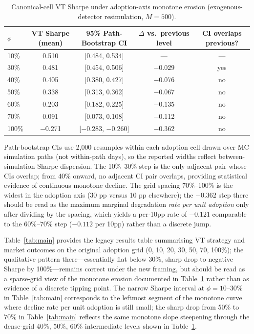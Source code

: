 \documentclass[12pt,a4paper]{article}
\begin{document}
\begin{table}[H]
\centering
\begin{threeparttable}
\caption{Canonical-cell VT Sharpe under adoption-axis monotone erosion (exogenous-detector resimulation, $M = 500$).}
\label{tab:vt_monotone_curve}
\footnotesize
\begin{tabular}{@{}lcccc@{}}
\toprule
$\phi$ & VT Sharpe (mean) & 95\% Path-Bootstrap CI & $\Delta$ vs.\ previous level & CI overlaps previous? \\
\midrule
10\%  & 0.510  & [0.484, 0.534]   & ---     & ---  \\
30\%  & 0.481  & [0.454, 0.506]   & $-$0.029 & yes  \\
40\%  & 0.405  & [0.380, 0.427]   & $-$0.076 & no   \\
50\%  & 0.338  & [0.313, 0.362]   & $-$0.067 & no   \\
60\%  & 0.203  & [0.182, 0.225]   & $-$0.135 & no   \\
70\%  & 0.091  & [0.073, 0.108]   & $-$0.112 & no   \\
100\% & $-$0.271 & [$-$0.283, $-$0.260] & $-$0.362 & no   \\
\bottomrule
\end{tabular}
\begin{tablenotes}
\footnotesize
\item Path-bootstrap CIs use 2{,}000 resamples within each adoption cell drawn over MC simulation paths (not within-path days), so the reported widths reflect between-simulation Sharpe dispersion. The 10\%--30\% step is the only adjacent pair whose CIs overlap; from 40\% onward, no adjacent CI pair overlaps, providing statistical evidence of continuous monotone decline. The grid spacing 70\%--100\% is the widest in the adoption axis (30 pp versus 10 pp elsewhere); the $-0.362$ step there should be read as the maximum marginal degradation \emph{rate per unit adoption} only after dividing by the spacing, which yields a per-10pp rate of $-0.121$ comparable to the 60\%--70\% step ($-0.112$ per 10pp) rather than a discrete jump.
\end{tablenotes}
\end{threeparttable}
\end{table}

Table~\ref{tab:main} provides the legacy results table summarising VT strategy and market outcomes on the original adoption grid (0, 10, 20, 30, 50, 70, 100\%); the qualitative pattern there---essentially flat below 30\%, sharp drop to negative Sharpe by 100\%---remains correct under the new framing, but should be read as a sparse-grid view of the monotone erosion documented in Table~\ref{tab:vt_monotone_curve} rather than as evidence of a discrete tipping point. The narrow Sharpe interval at $\phi = 10$--$30\%$ in Table~\ref{tab:main} corresponds to the leftmost segment of the monotone curve where decline rate per unit adoption is still small; the sharp drop from 50\% to 70\% in Table~\ref{tab:main} reflects the same monotone slope steepening through the dense-grid 40\%, 50\%, 60\% intermediate levels shown in Table~\ref{tab:vt_monotone_curve}.
\end{document}
